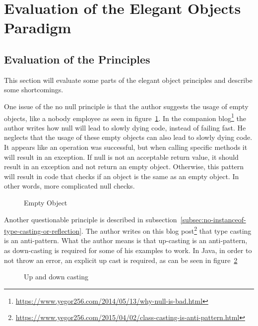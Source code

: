 \section{Evaluation of the Elegant Objects Paradigm}\label{sec:evaluation-of-the-elegant-objects-paradigm}
\subsection{Evaluation of the Principles}\label{subsec:evaluation-of-the-principles}
This section will evaluate some parts of the elegant object principles and describe some shortcomings.

One issue of the no null principle is that the author suggests the usage of empty objects, like a nobody employee as seen in figure\ \ref{fig:empty-object}.
In the companion blog\footnote{\url{https://www.yegor256.com/2014/05/13/why-null-is-bad.html}} the author writes how null will lead to slowly dying code, instead of failing fast.
He neglects that the usage of these empty objects can also lead to slowly dying code.
It appears like an operation was successful, but when calling specific methods it will result in an exception.
If null is not an acceptable return value, it should result in an exception and not return an empty object.
Otherwise, this pattern will result in code that checks if an object is the same as an empty object.
In other words, more complicated null checks.

\begin{figure}[h]
    \caption{Empty Object}
    \label{fig:empty-object}
\end{figure}

Another questionable principle is described in subsection\ \ref{subsec:no-instanceof-type-casting-or-reflection}.
The author writes on this blog post\footnote{\url{https://www.yegor256.com/2015/04/02/class-casting-is-anti-pattern.html}} that type casting is an anti-pattern.
What the author means is that up-casting is an anti-pattern, as down-casting is required for some of his examples to work.
In Java, in order to not throw an error, an explicit up cast is required, as can be seen in figure\ \ref{fig:up-and-down-casting}

\begin{figure}[h]
    \caption{Up and down casting}
    
    \label{fig:up-and-down-casting}
\end{figure}

